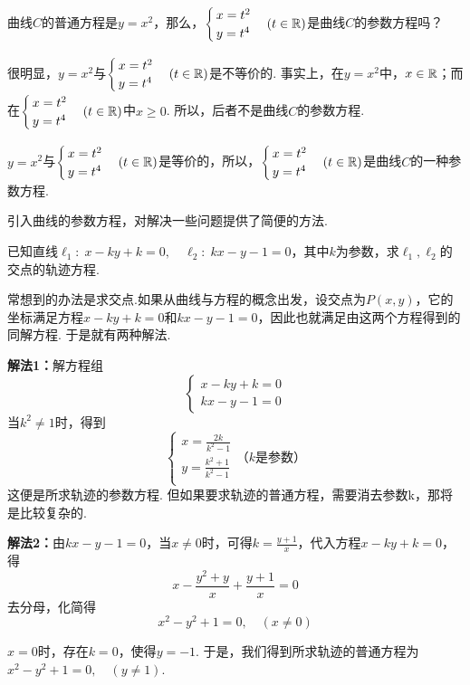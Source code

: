 \begin{example}
   曲线$C$的普通方程是$y=x^2$，那么，$\begin{cases}
       x=t^2\\y=t^4
   \end{cases}(t\in\mathbb{R})$是曲线$C$的参数方程吗？
\end{example}

\begin{solution}
很明显，$y=x^2$与$\begin{cases}
    x=t^2\\y=t^4
\end{cases}(t\in\mathbb{R})$是不等价的. 事实上，在$y=x^2$中，$x\in\mathbb{R}$；而在$\begin{cases}
    x=t^2\\y=t^4
\end{cases}(t\in\mathbb{R})$中$x\ge 0$. 所以，后者不是曲线$C$的参数方程.

$y=x^2$与$\begin{cases}
    x=t^2\\y=t^4
\end{cases}(t\in\mathbb{R})$是等价的，所以，$\begin{cases}
    x=t^2\\y=t^4
\end{cases}(t\in\mathbb{R})$是曲线$C$的一种参数方程.

引入曲线的参数方程，对解决一些问题提供了简便的方法.
\end{solution}

\begin{example}
    已知直线$\ell_1:\; x-ky+k=0,\quad \ell_2:\; kx-y-1=0$，其中$k$为参数，求$\ell_1,\ell_2$的交点的轨迹方程.
\end{example}

\begin{analyze}
    常想到的办法是求交点.如果从曲线与方程的概念出发，设交点为$P(x,y)$，它的坐标满足方程$x-ky+k=0$和$kx-y-1=0$，因此也就满足由这两个方程得到的同解方程. 于是就有两种解法.
\end{analyze}

\begin{solution}
\textbf{解法1：}解方程组
\[\begin{cases}
    x-ky+k=0\\ kx-y-1=0
\end{cases}\]
当$k^2\ne 1$时，得到$$\begin{cases}
    x=\frac{2k}{k^2-1}\\[1.5ex]
    y=\frac{k^2+1}{k^2-1}\\
\end{cases}\text{（$k$是参数）}$$
这便是所求轨迹的参数方程. 但如果要求轨迹的普通方程，需要消去参数k，那将是比较复杂的.

\textbf{解法2：}由$kx-y-1=0$，当$x\ne 0$时，可得$k=\frac{y+1}{x}$，代入方程$x-ky+k=0$，得
\[x-\frac{y^2+y}{x}+\frac{y+1}{x}=0\]
去分母，化简得
\[x^2-y^2+1=0,\quad (x\ne 0)\]

$x=0$时，存在$k=0$，使得$y=-1$. 于是，我们得到所求轨迹的普通方程为$x^2-y^2+1=0,\quad (y\ne 1)$.
\end{solution}

